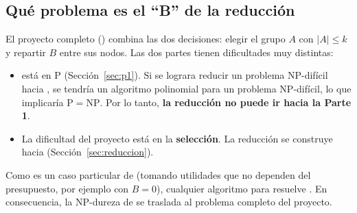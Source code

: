 \subsection{Qué problema es el ``B'' de la reducción}\label{sec:cualB}

El proyecto completo (\RED) combina las dos decisiones: elegir el grupo $A$ con $|A|\le k$ y repartir $B$ entre sus nodos. Las dos partes tienen dificultades muy distintas:

\begin{itemize}
  \item \REP{} está en P (Sección~\ref{sec:p1}). Si se lograra reducir un problema NP-difícil hacia \REP, se tendría un algoritmo polinomial para un problema NP-difícil, lo que implicaría $\mathrm{P}=\mathrm{NP}$. Por lo tanto, \textbf{la reducción no puede ir hacia la Parte 1}.
  \item La dificultad del proyecto está en la \textbf{selección}. La reducción se construye hacia \SEL{} (Sección~\ref{sec:reduccion}).
\end{itemize}

Como \SEL{} es un caso particular de \RED{} (tomando utilidades que no dependen del presupuesto, por ejemplo con $B=0$), cualquier algoritmo para \RED{} resuelve \SEL. En consecuencia, la NP-dureza de \SEL{} se traslada al problema completo del proyecto.
